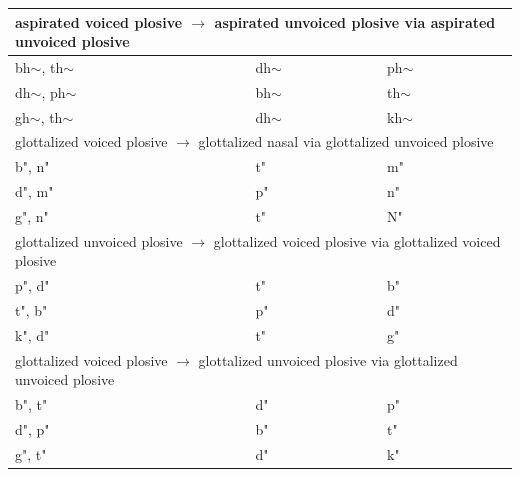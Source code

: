 \documentclass[11pt]{article}
\begin{document}
\begin{table}[h]
\begin{tabular}{ l | l | l }
 \hline \multicolumn{3}{l}{aspirated voiced plosive $\rightarrow$ aspirated unvoiced plosive via aspirated unvoiced plosive    }\\  \hline
bh$\sim$, th$\sim$ & dh$\sim$ & ph$\sim$ \\
dh$\sim$, ph$\sim$ & bh$\sim$ & th$\sim$ \\
gh$\sim$, th$\sim$ & dh$\sim$ & kh$\sim$ \\

 \hline \multicolumn{3}{l}{glottalized voiced plosive $\rightarrow$  glottalized nasal via glottalized unvoiced plosive }\\  \hline
b", n" & t" & m" \\
d", m" & p" & n" \\
g", n" & t" & N" \\

 \hline \multicolumn{3}{l}{glottalized unvoiced plosive $\rightarrow$ glottalized voiced plosive via glottalized voiced plosive   }\\  \hline
p", d" & t" & b" \\
t", b" & p" & d" \\
k", d" & t" & g" \\

 \hline \multicolumn{3}{l}{glottalized voiced plosive $\rightarrow$ glottalized unvoiced plosive via glottalized unvoiced plosive   }\\  \hline
b", t" & d" & p" \\
d", p" & b" & t" \\
g", t" & d" & k" \\


\end{tabular}
\end{table}
\end{document}
